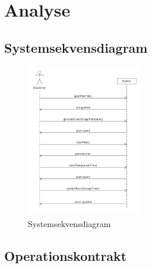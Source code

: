 \chapter{Analyse}\label{sec:analyse}

\section{Systemsekvensdiagram}
\begin{figure}
    \centering
    \includegraphics[width=50mm,scale=0.5]{figures/analyse/SSD.png}
    \caption{Systemsekvensdiagram}
    \label{fig:ssd}
\end{figure}


\section{Operationskontrakt}

